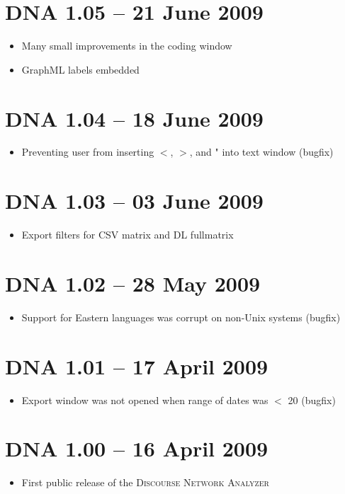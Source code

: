 \documentclass[12pt,a4paper]{scrreprt}
\newcommand{\dnalong}{\textsc{Discourse} \textsc{Network} \textsc{Analyzer}}
\begin{document}
\section*{DNA 1.05 -- 21 June 2009}
\begin{itemize}
 \item Many small improvements in the coding window
 \item GraphML labels embedded
\end{itemize}

\section*{DNA 1.04 -- 18 June 2009}
\begin{itemize}
 \item Preventing user from inserting $<$, $>$, and " into text window (bugfix)
\end{itemize}

\section*{DNA 1.03 -- 03 June 2009}
\begin{itemize}
 \item Export filters for CSV matrix and DL fullmatrix
\end{itemize}

\section*{DNA 1.02 -- 28 May 2009}
\begin{itemize}
 \item Support for Eastern languages was corrupt on non-Unix systems (bugfix)
\end{itemize}

\section*{DNA 1.01 -- 17 April 2009}
\begin{itemize}
 \item Export window was not opened when range of dates was $<$ 20 (bugfix)
\end{itemize}

\section*{DNA 1.00 -- 16 April 2009}
\begin{itemize}
 \item First public release of the \dnalong
\end{itemize}




\end{document}
